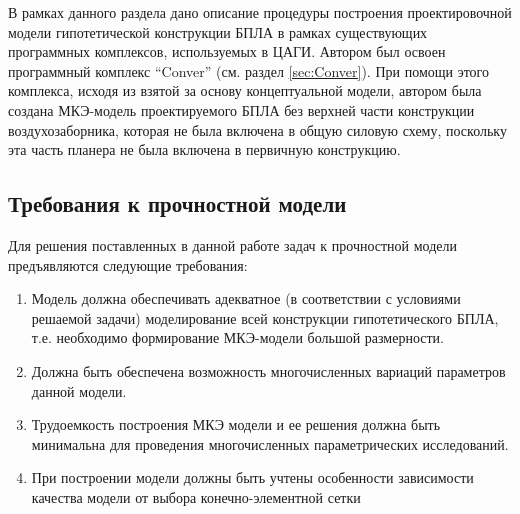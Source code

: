 
В рамках данного раздела дано описание процедуры построения проектировочной модели гипотетической конструкции БПЛА в рамках существующих программных комплексов, используемых в ЦАГИ. Автором был освоен программный комплекс ``Conver'' (см. раздел \ref{sec:Conver}). 
При помощи этого комплекса, исходя из взятой за основу концептуальной модели, автором была создана МКЭ-модель проектируемого БПЛА без верхней части конструкции воздухозаборника, которая не была включена в общую силовую схему, поскольку эта часть планера не была включена в первичную конструкцию.




\subsection{Требования к прочностной модели}

Для решения поставленных в данной работе задач к прочностной модели предъявляются следующие требования:



\begin{enumerate}
\item Модель должна обеспечивать адекватное (в соответствии с условиями решаемой задачи) моделирование всей конструкции гипотетического БПЛА, т.е. необходимо формирование МКЭ-модели большой размерности.
\item Должна быть обеспечена возможность многочисленных вариаций параметров данной модели.
\item Трудоемкость построения МКЭ модели и ее решения должна быть минимальна для проведения многочисленных параметрических исследований.
\item При построении модели должны быть учтены особенности зависимости качества модели от выбора конечно-элементной сетки
\end{enumerate}

